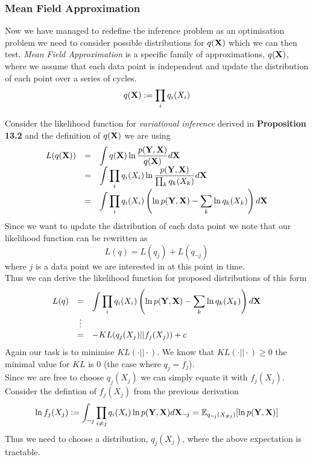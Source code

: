 \documentclass[11pt,a4paper]{article}
\begin{document}
\subsubsection{Mean Field Approximation}

Now we have managed to redefine the inference problem as an optimisation problem we need to consider possible distributions for $q(\textbf{X})$ which we can then test. \textit{Mean Field Approximation} is a specific family of approximations, $q(\textbf{X})$, where we assume that each data point is independent and update the distribution of each point over a series of cycles.
$$q(\textbf{X}):=\prod_iq_i(X_i)$$

Consider the likelihood function for \textit{variational inference} derived in \textbf{Proposition 13.2} and the definition of $q(\textbf{X})$ we are using
\[\begin{array}{rcl}
L(q(\textbf{X}))&=&\displaystyle\int q(\textbf{X})\ln\dfrac{p(\textbf{Y},\textbf{X})}{q(\textbf{X})}d\textbf{X}\\
&=&{\displaystyle\int\prod_iq_i(X_i)\ln\dfrac{p(\textbf{Y},\textbf{X})}{\prod_kq_k(X_k)}d\textbf{X}}\\
&=&{\displaystyle\int\prod_iq_i(X_i)\left(\ln p(\textbf{Y},\textbf{X})-\sum_k\ln q_k(X_k)\right)d\textbf{X}}
\end{array}\]
Since we want to update the distribution of each data point we note that our likelihood function can be rewritten as
$$L(q)=L(q_j)+L(q_{\neg j})$$
where $j$ is a data point we are interested in at this point in time.\\
Thus we can derive the likelihood function for proposed distributions of this form
\[\begin{array}{rcl}
L(q)&=&{\displaystyle\int\prod_iq_i(X_i)\left(\ln p(\textbf{Y},\textbf{X})-\sum_k\ln q_k(X_k)\right)d\textbf{X}}\\
&\vdots\\
&=&-KL(q_j(X_j)||f_j(X_j))+c
\end{array}\]
Again our task is to minimise $KL(\cdot||\cdot)$. We know that $KL(\cdot||\cdot)\geq0$ the minimal value for $KL$ is 0 (the case where $q_j=f_j$).\\
Since we are free to choose $q_j(X_j)$ we can simply equate it with $f_j(X_j)$.\\
Consider the defintion of $f_j(X_j)$ from the previous derivation
$$\ln f_j(X_j):=\int_{\neg j}\prod_{i\neq j}q_i(X_i)\ln p(\textbf{Y},\textbf{X})d\textbf{X}_{\neg j}=\mathbb{E}_{q_{\neg j}(X_{\neq j})}[\ln p(\textbf{Y},\textbf{X})]$$
Thus we need to choose a distribution, $q_j(X_j)$, where the above expectation is tractable.\\
\end{document}

